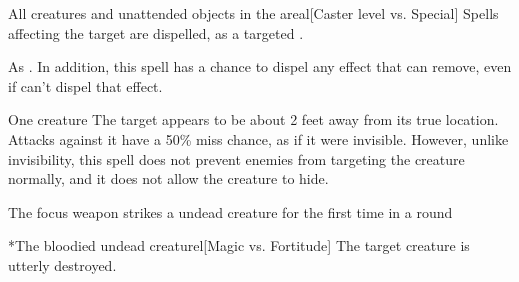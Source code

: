 \begin{spellheader}
\end{spellheader}
\begin{spelleffects}
    \begin{spelltargets}{All creatures and unattended objects in the area}l[Caster level vs. Special]
        \spelleffect Spells affecting the target are dispelled, as a targeted .
    \end{spelltargets}
\end{spelleffects}
\begin{spellfooter}
    \spellnotes As . In addition, this spell has a chance to dispel any effect that  can remove, even if  can't dispel that effect.
\end{spellfooter}

\begin{spellheader}
    \spellrng{\rngclose}
    \spelldur{\durshort \dismissable}
\end{spellheader}
\begin{spelleffects}
    \begin{spelltarget}{One creature}
        \spelleffect The target appears to be about 2 feet away from its true location. Attacks against it have a 50\% miss chance, as if it were invisible. However, unlike invisibility, this spell does not prevent enemies from targeting the creature normally, and it does not allow the creature to hide.
    \end{spelltarget}
\end{spelleffects}
\begin{spellfooter}
    
\end{spellfooter}

\begin{spellheader}
    \spellrng{\rngclose}
    \spelldur{\durshort}
\end{spellheader}
\begin{spelltrigger}{The focus weapon strikes a \bloodied undead creature for the first time in a round}
    \begin{spelltarget}*{The bloodied undead creature}l[Magic vs. Fortitude]
        \spellsuccess The target creature is utterly destroyed.
    \end{spelltarget}
\end{spelltrigger}

